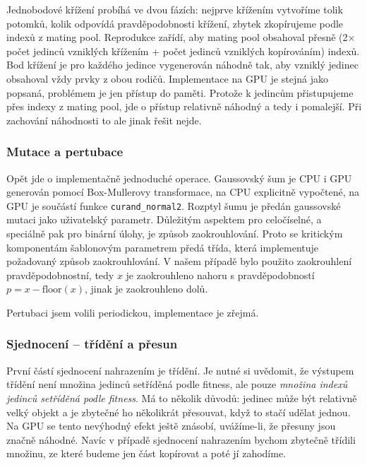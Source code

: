 Jednobodové křížení probíhá ve dvou fázích: nejprve křížením vytvoříme tolik potomků, kolik odpovídá pravděpodobnosti křížení, zbytek zkopírujeme podle indexů z mating pool. Reprodukce zařídí, aby mating pool obsahoval přesně (2$\times$počet jedinců vzniklých křížením + počet jedinců vzniklých kopírováním) indexů. Bod křížení je pro každého jedince vygenerován náhodně tak, aby vzniklý jedinec obsahoval vždy prvky z obou rodičů. Implementace na GPU je stejná jako popsaná, problémem je jen přístup do paměti. Protože k jedincům přistupujeme přes indexy z mating pool, jde o přístup relativně náhodný a tedy i pomalejší. Při zachování náhodnosti to ale jinak řešit nejde.

\subsubsection{Mutace a pertubace}

Opět jde o implementačně jednoduché operace. Gaussovský šum je CPU i GPU generován pomocí Box-Mullerovy transformace, na CPU explicitně vypočtené, na GPU je součástí funkce \texttt{curand\_normal2}. Rozptyl šumu je předán gaussovské mutaci jako uživatelský parametr. Důležitým aspektem pro celočíselné, a speciálně pak pro binární úlohy, je způsob zaokrouhlování. Proto se kritickým komponentám šablonovým parametrem předá třída, která implementuje požadovaný způsob zaokrouhlování. V našem případě bylo použito zaokrouhlení pravděpodobnostní, tedy $x$ je zaokrouhleno nahoru s pravděpodobností $p = x - \text{floor}(x)$, jinak je zaokrouhleno dolů.

Pertubaci jsem volili periodickou, implementace je zřejmá.

\subsubsection{Sjednocení -- třídění a přesun}

První částí sjednocení nahrazením je třídění. Je nutné si uvědomit, že výstupem třídění není množina jedinců setříděná podle fitness, ale pouze \emph{množina indexů jedinců setříděná podle fitness}. Má to několik důvodů: jedinec může být relativně velký objekt a je zbytečné ho několikrát přesouvat, když to stačí udělat jednou. Na GPU se tento nevýhodný efekt ještě znásobí, uvážíme-li, že přesuny jsou značně náhodné. Navíc v případě sjednocení nahrazením bychom zbytečně třídili množinu, ze které budeme jen část kopírovat a poté jí zahodíme.

